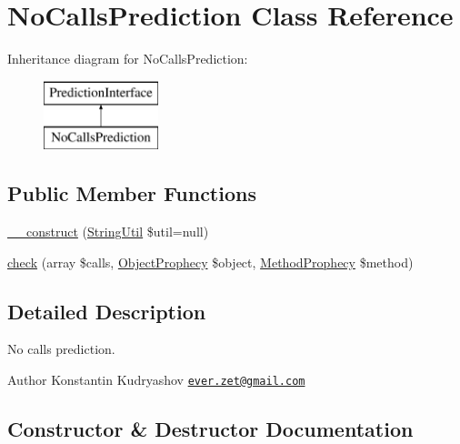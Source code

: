 \hypertarget{class_prophecy_1_1_prediction_1_1_no_calls_prediction}{}\section{No\+Calls\+Prediction Class Reference}
\label{class_prophecy_1_1_prediction_1_1_no_calls_prediction}
Inheritance diagram for No\+Calls\+Prediction\+:\begin{figure}[H]
\begin{center}
\leavevmode
\includegraphics[height=2.000000cm]{class_prophecy_1_1_prediction_1_1_no_calls_prediction}
\end{center}
\end{figure}
\subsection*{Public Member Functions}
\begin{DoxyCompactItemize}
\item 
\mbox{\hyperlink{class_prophecy_1_1_prediction_1_1_no_calls_prediction_a957995a2f5cd98ebb4093190b136df61}{\+\_\+\+\_\+construct}} (\mbox{\hyperlink{class_prophecy_1_1_util_1_1_string_util}{String\+Util}} \$util=null)
\item 
\mbox{\hyperlink{class_prophecy_1_1_prediction_1_1_no_calls_prediction_a8753cea9fc952add136830abab587633}{check}} (array \$calls, \mbox{\hyperlink{class_prophecy_1_1_prophecy_1_1_object_prophecy}{Object\+Prophecy}} \$object, \mbox{\hyperlink{class_prophecy_1_1_prophecy_1_1_method_prophecy}{Method\+Prophecy}} \$method)
\end{DoxyCompactItemize}


\subsection{Detailed Description}
No calls prediction.

\begin{DoxyAuthor}{Author}
Konstantin Kudryashov \href{mailto:ever.zet@gmail.com}{\tt ever.\+zet@gmail.\+com} 
\end{DoxyAuthor}


\subsection{Constructor \& Destructor Documentation}
\mbox{\label{class_prophecy_1_1_prediction_1_1_no_calls_prediction_a957995a2f5cd98ebb4093190b136df61}} 
